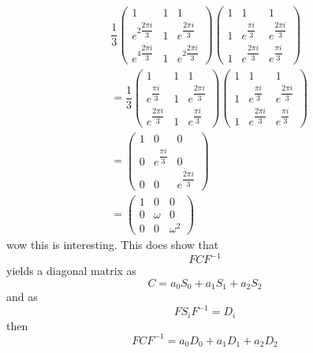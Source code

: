 \documentclass{article}
\begin{document}
\begin{align}
	&\dfrac{1}{3}
	\begin{pmatrix}
		1 & 1 & 1 \\
	e^{2\dfrac{2\pi i}{3}} &	1 & e^{\dfrac{2\pi i}{3}}  \\
	e^{4\dfrac{2\pi i}{3}}&	1& e^{2\dfrac{2\pi i}{3}}
	\end{pmatrix}
	\begin{pmatrix}
		1 & 1 & 1 \\
		1 & e^{\dfrac{\pi i}{3}} & e^{\dfrac{2\pi i}{3}} \\
		1& e^{\dfrac{2\pi i}{3}} & e^{\dfrac{\pi i}{3}}
	\end{pmatrix}\\
&=\dfrac{1}{3}
\begin{pmatrix}
	1 & 1 & 1 \\
	e^{\dfrac{\pi i}{3}} &	1 & e^{\dfrac{2\pi i}{3}}  \\
	e^{\dfrac{2\pi i}{3}}&	1& e^{\dfrac{\pi i}{3}}
\end{pmatrix}
\begin{pmatrix}
	1 & 1 & 1 \\
	1 & e^{\dfrac{\pi i}{3}} & e^{\dfrac{2\pi i}{3}} \\
	1& e^{\dfrac{2\pi i}{3}} & e^{\dfrac{\pi i}{3}}
\end{pmatrix}\\
&=\begin{pmatrix}
	1 & 0 & 0 \\
	0 & e^{\dfrac{\pi i}{3}} & 0 \\
	0& 0 & e^{\dfrac{2\pi i}{3}}
\end{pmatrix}\\
&=\begin{pmatrix}
	1 & 0 & 0 \\
	0 & \omega & 0 \\
	0& 0 & \omega^2
\end{pmatrix}\
\end{align}
wow this is interesting.
This does show that 
\begin{equation}
	FCF^{-1}
\end{equation}
yields a diagonal matrix
as 
\begin{equation}
	C = a_0S_0
	+a_1S_1 + a_2S_2
\end{equation}
and as
\begin{equation}
	FS_iF^{-1} = D_i
\end{equation}
then 
\begin{equation}
	FCF^{-1} =  a_0D_0
	+a_1D_1 + a_2D_2
\end{equation}
\end{document}
